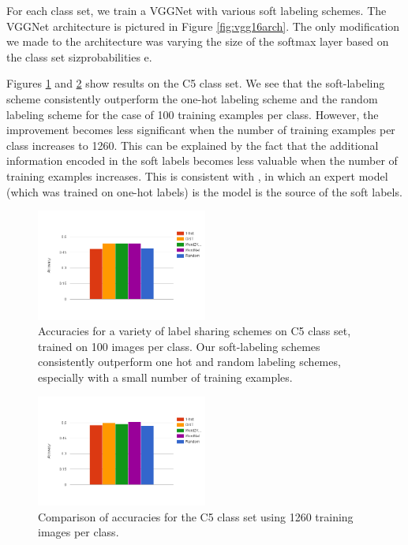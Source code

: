 For each class set, we train a VGGNet with various soft labeling schemes. The
VGGNet architecture is pictured in Figure \ref{fig:vgg16arch}. The only
modification we made to the architecture was varying the size of the softmax
layer based on the class set sizprobabilities e.

Figures \ref{fig:5_1-train_100} and \ref{fig:5_1-train_1260} show results on the
C5 class set. We see that the soft-labeling scheme consistently outperform the
one-hot labeling scheme and the random labeling scheme for the case of 100
training examples per class. However, the improvement becomes less significant
when the number of training examples per class increases to 1260. This can be
explained by the fact that the additional information encoded in the soft labels
becomes less valuable when the number of training examples increases. This is
consistent with \cite{hinton2015distilling}, in which an expert model (which was
trained on one-hot labels) is the model is the source of the soft labels.

\begin{figure}[!tb]
  \centering
  \includegraphics[width=0.5\textwidth]{figs/5_1-train_100.png}
  \caption{
      Accuracies for a variety of label sharing schemes on C5 class set,
      trained on 100 images per class. Our soft-labeling schemes consistently
      outperform one hot and random labeling schemes, especially with a small
      number of training examples.
  }
  \label{fig:5_1-train_100}
\end{figure}

\begin{figure}[!tb]
  \centering
  \includegraphics[width=0.5\textwidth]{figs/5_1-train_1260.png}
  \caption{
      Comparison of accuracies for the C5 class set using 1260 training images
      per class.
  }
  \label{fig:5_1-train_1260}
\end{figure}

